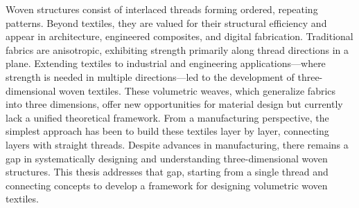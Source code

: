 
Woven structures consist of interlaced threads forming ordered, repeating patterns. Beyond textiles, they are valued for their structural efficiency and appear in architecture, engineered composites, and digital fabrication. Traditional fabrics are anisotropic, exhibiting strength primarily along thread directions in a plane. Extending textiles to industrial and engineering applications—where strength is needed in multiple directions—led to the development of three-dimensional woven textiles. These volumetric weaves, which generalize fabrics into three dimensions, offer new opportunities for material design but currently lack a unified theoretical framework. From a manufacturing perspective, the simplest approach has been to build these textiles layer by layer, connecting layers with straight threads. Despite advances in manufacturing, there remains a gap in systematically designing and understanding three-dimensional woven structures. This thesis addresses that gap, starting from a single thread and connecting concepts to develop a framework for designing volumetric woven textiles.

